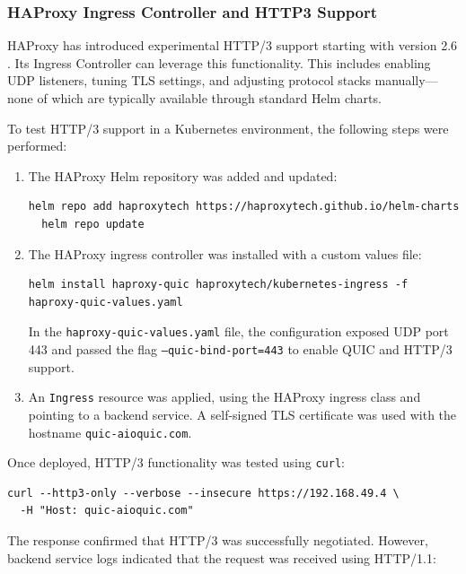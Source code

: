 \subsubsection{HAProxy Ingress Controller and HTTP3 Support}
HAProxy has introduced experimental HTTP/3 support starting with version 2.6 \cite{haproxy-docs} \cite{haproxy-k8s-docs}. Its Ingress Controller can leverage this functionality. This includes enabling UDP listeners, tuning TLS settings, and adjusting protocol stacks manually—none of which are typically available through standard Helm charts. 


To test HTTP/3 support in a Kubernetes environment, the following steps were performed:

\begin{enumerate}
  \item The HAProxy Helm repository was added and updated:
  \begin{lstlisting}[breaklines=true,basicstyle=\small\ttfamily,frame=single]
  helm repo add haproxytech https://haproxytech.github.io/helm-charts
  helm repo update
  \end{lstlisting}

  \item The HAProxy ingress controller was installed with a custom values file:
  \begin{lstlisting}[breaklines=true,basicstyle=\small\ttfamily,frame=single]
  helm install haproxy-quic haproxytech/kubernetes-ingress -f haproxy-quic-values.yaml
  \end{lstlisting}

  In the \texttt{haproxy-quic-values.yaml} file, the configuration exposed UDP port 443 and passed the flag \texttt{--quic-bind-port=443} to enable QUIC and HTTP/3 support.

  \item An \texttt{Ingress} resource was applied, using the HAProxy ingress class and pointing to a backend service. A self-signed TLS certificate was used with the hostname \texttt{quic-aioquic.com}.
\end{enumerate}

Once deployed, HTTP/3 functionality was tested using \texttt{curl}:

\begin{lstlisting}[breaklines=true,basicstyle=\small\ttfamily,frame=single]
curl --http3-only --verbose --insecure https://192.168.49.4 \
  -H "Host: quic-aioquic.com"
\end{lstlisting}

The response confirmed that HTTP/3 was successfully negotiated. However, backend service logs indicated that the request was received using HTTP/1.1:


